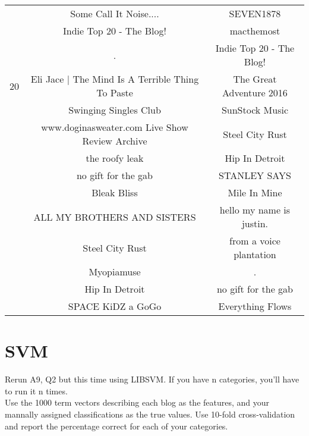 \documentclass{article}
\begin{document}
\begin{table}[!htb]
\begin{tabular}{ccc}
				 & Some Call It Noise.... & SEVEN1878\\
				 & Indie Top 20 - The Blog! & macthemost\\
				 & . & Indie Top 20 - The Blog!\\
				20 & Eli Jace | The Mind Is A Terrible Thing To Paste & The Great Adventure 2016\\
				 & Swinging Singles Club & SunStock Music\\
				 & www.doginasweater.com Live Show Review Archive & Steel City Rust\\
				 & the roofy leak & Hip In Detroit\\
				 & no gift for the gab & STANLEY SAYS\\
				 & Bleak Bliss & Mile In Mine\\
				 & ALL MY BROTHERS AND SISTERS & hello my name is justin.\\
				 & Steel City Rust & from a voice plantation\\
				 & Myopiamuse & .\\
				 & Hip In Detroit & no gift for the gab\\
				 & SPACE KiDZ a GoGo & Everything Flows\\
				\bottomrule
			\end{tabular}
		\end{table}

		\section{SVM}
		Rerun A9, Q2 but this time using LIBSVM. If you have n categories, you'll have to run it n times.\\
		\indent Use the 1000 term vectors describing each blog as the features, and your mannally assigned classifications as the true values. Use 10-fold cross-validation and report the percentage correct for each of your categories.\\
\end{document}
